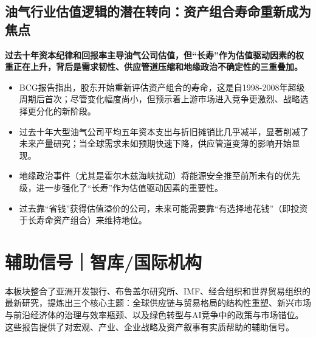 \documentclass[11pt]{ctexart}
\begin{document}
\subsection{油气行业估值逻辑的潜在转向：资产组合寿命重新成为焦点}
\textbf{过去十年资本纪律和回报率主导油气公司估值，但“长寿”作为估值驱动因素的权重正在上升，背后是需求韧性、供应管道压缩和地缘政治不确定性的三重叠加。}
\begin{itemize}
  \item BCG报告指出，股东开始重新评估资产组合的寿命，这是自1998-2008年超级周期后首次；尽管变化幅度尚小，但预示着上游市场进入竞争更激烈、战略选择更分化的新阶段。
  \item 过去十年大型油气公司平均五年资本支出与折旧摊销比几乎减半，显著削减了未来产量研究；当全球需求未如预期快速下降，供应管道变薄的影响开始显现。
  \item 地缘政治事件（尤其是霍尔木兹海峡扰动）将能源安全推至前所未有的优先级，进一步强化了“长寿”作为估值驱动因素的重要性。
  \item 过去靠“省钱”获得估值溢价的公司，未来可能需要靠“有选择地花钱”（即投资于长寿命资产组合）来维持地位。
\end{itemize}
\newpage
\section{辅助信号｜智库/国际机构}
本板块整合了亚洲开发银行、布鲁盖尔研究所、IMF、经合组织和世界贸易组织的最新研究，提炼出三个核心主题：全球供应链与贸易格局的结构性重塑、新兴市场与前沿经济体的治理与效率瓶颈、以及绿色转型与AI竞争中的政策与市场错位。这些报告提供了对宏观、产业、企业战略及资产叙事有实质帮助的辅助信号。
\end{document}
